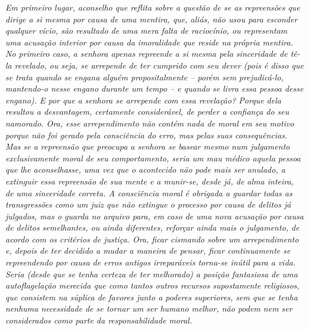 \emph{Em primeiro lugar, aconselho que reflita sobre a questão de se as
repreensões que dirige a si mesma por causa de uma mentira, que, aliás,
não usou para esconder qualquer vício, são resultado de uma mera falta
de raciocínio, ou representam uma acusação interior por causa da
imoralidade que reside na própria mentira. No primeiro caso, a senhora
apenas repreende a si mesma pela sinceridade de tê-la revelado, ou seja,
se arrepende de ter cumprido com seu dever (pois é disso que se trata
quando se engana alguém propositalmente -- porém sem prejudicá-lo,
mantendo-o nesse engano durante um tempo -- e quando se livra essa
pessoa desse engano). E por que a senhora se arrepende com essa
revelação? Porque dela resultou a desvantagem, certamente considerável,
de perder a confiança do seu namorado. Ora, esse arrependimento não
contém nada de moral em seu motivo porque não foi gerado pela
consciência do erro, mas pelas suas consequências. Mas se a repreensão
que preocupa a senhora se basear mesmo num julgamento exclusivamente
moral de seu comportamento, seria um mau médico aquela pessoa que lhe
aconselhasse, uma vez que o acontecido não pode mais ser anulado, a
extinguir essa repreensão de sua mente e a munir-se, desde já, de alma
inteira, de uma sinceridade correta. A consciência moral é obrigada a
guardar todas as transgressões como um juiz que não extingue o processo
por causa de delitos já julgados, mas o guarda no arquivo para, em caso
de uma nova acusação por causa de delitos semelhantes, ou ainda
diferentes, reforçar ainda mais o julgamento, de acordo com os critérios
de justiça. Ora, ficar cismando sobre um arrependimento e, depois de ter
decidido a mudar a maneira de pensar, ficar continuamente se
repreendendo por causa de erros antigos irreparáveis torna-se inútil
para a vida. Seria (desde que se tenha certeza de ter melhorado) a
posição fantasiosa de uma autoflagelação merecida que como tantos outros
recursos supostamente religiosos, que consistem na súplica de favores
junto a poderes superiores, sem que se tenha nenhuma necessidade de se
tornar um ser humano melhor, não podem nem ser considerados como parte
da responsabilidade moral.}

